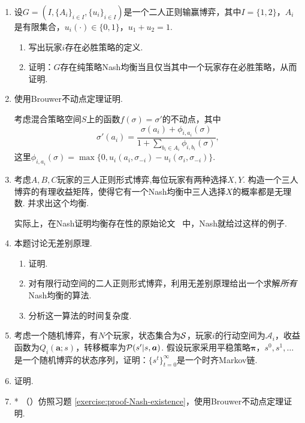 \begin{enumerate}[wide, labelindent=0pt]
    \item \label{exercise:zero-sum-pure-NE} 设$G=(I,\{A_i\}_{i\in I}, \{u_i\}_{i\in I})$是一个二人正则输赢博弈，其中$I=\{1,2\}$，$A_i$是有限集合，$u_i(\cdot)\in\{0,1\}$，$u_1+u_2=1$.
    \begin{enumerate}
        \item 写出玩家$i$存在必胜策略的定义.
        \item 证明：$G$存在纯策略Nash均衡当且仅当其中一个玩家存在必胜策略，从而证明.
    \end{enumerate}

    \item \label{exercise:proof-Nash-existence} 使用Brouwer不动点定理证明.
        \begin{hint}
        考虑混合策略空间$S$上的函数$f(\sigma) = \sigma'$的不动点，其中
        \[\sigma'(a_i) = \frac{\sigma(a_i) + \phi_{i,a_i}(\sigma)}{1+\sum_{b_i\in A_i}\phi_{i,b_i}(\sigma)},\]
        这里$\phi_{i,a_i}(\sigma)=\max\{0, u_i(a_i,\sigma_{-i})-u_i(\sigma_i,\sigma_{-i})\}$. 
        \end{hint}
    
    \item 考虑$A,B,C$玩家的三人正则形式博弈,每位玩家有两种选择$X,Y$. 构造一个三人博弈的有理收益矩阵，使得它有一个Nash均衡中三人选择$X$的概率都是无理数. 并求出这个均衡.
    \begin{hint}
        实际上，在Nash证明均衡存在性的原始论文~\cite{nashNonCooperativeGames1951} 中，Nash就给过这样的例子.
    \end{hint}

    \item \label{exercise:indifference-principle} 本题讨论无差别原理. 
    \begin{enumerate}
        \item 证明.
        \item 对有限行动空间的二人正则形式博弈，利用无差别原理给出一个求解\textit{所有}Nash均衡的算法. 
        \item 分析这一算法的时间复杂度.
    \end{enumerate}

    \item \label{exercise:state-sequence-Markov} 考虑一个随机博弈，有$N$个玩家，状态集合为$\mathcal S$，玩家$i$的行动空间为$\mathcal A_i$，收益函数为$Q_i(\boldsymbol a;s)$，转移概率为$\mathcal P(s'|s,\boldsymbol a)$. 假设玩家采用平稳策略$\boldsymbol \pi$，$s^0,s^1,\dots$是一个随机博弈的状态序列，证明：$\{s^t\}_{t=0}^{\infty}$是一个时齐Markov链. 
    
    \item \label{exercise:stochastic-game-bellman} 证明.
    
    \item *\label{exercise:proof-MPE-existence} （\cite{dengComplexityComputingMarkov2023}）仿照习题 \ref{exercise:proof-Nash-existence}，使用Brouwer不动点定理证明.
\end{enumerate}
